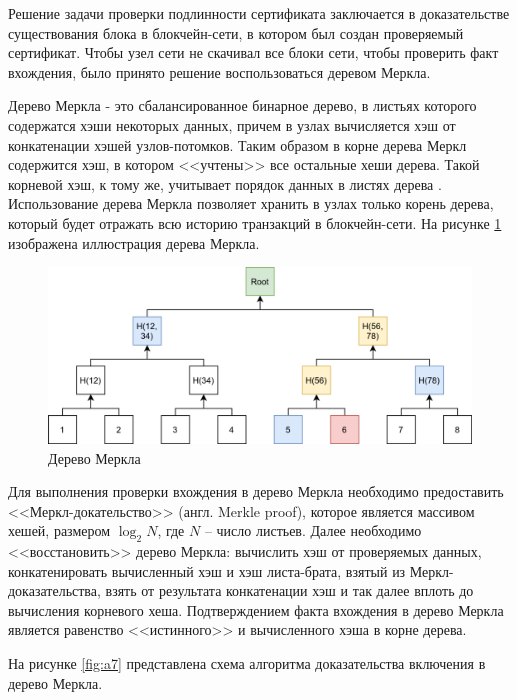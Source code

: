 Решение задачи проверки подлинности сертификата заключается в доказательстве существования блока в блокчейн-сети, в котором был создан проверяемый сертификат. Чтобы узел сети не скачивал все блоки сети, чтобы проверить факт вхождения, было принято решение воспользоваться деревом Меркла. 

Дерево Меркла - это сбалансированное бинарное дерево, в листьях которого содержатся хэши некоторых данных, причем в узлах вычисляется хэш от конкатенации хэшей узлов-потомков. Таким образом в корне дерева Меркл содержится хэш, в котором <<учтены>> все остальные хеши дерева. Такой корневой хэш, к тому же, учитывает порядок данных в листях дерева \cite{merkle}. Использование дерева Меркла позволяет хранить в узлах только корень дерева, который будет отражать всю историю транзакций в блокчейн-сети. На рисунке \ref{fig:a6} изображена иллюстрация дерева Меркла.

\begin{figure}[hbtp]
	\centering
	\includegraphics[width=\textwidth]{img/merkle_tree.png}
	\caption{Дерево Меркла}
	\label{fig:a6}
\end{figure}

Для выполнения проверки вхождения в дерево Меркла необходимо предоставить <<Меркл-докательство>> (англ. Merkle proof), которое является массивом хешей, размером $\log_{2}{N}$, где $N$ -- число листьев. Далее необходимо <<восстановить>> дерево Меркла: вычислить хэш от проверяемых данных, конкатенировать вычисленный хэш и хэш листа-брата, взятый из Меркл-доказательства, взять от результата конкатенации хэш и так далее вплоть до вычисления корневого хеша.
Подтверждением факта вхождения в дерево Меркла является равенство <<истинного>> и вычисленного хэша в корне дерева.

На рисунке \ref{fig:a7} представлена схема алгоритма доказательства включения в дерево Меркла.

